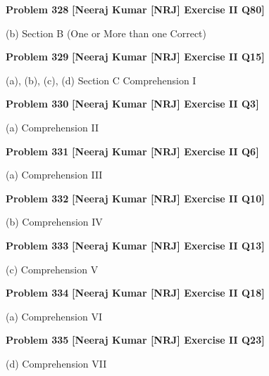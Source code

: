 \begin{problembox}
\textbf{Problem 328} \hfill \textbf{[Neeraj Kumar [NRJ] Exercise II Q80]}
\label{q:ext-nrj_all_questions-328}

(b)
Section B (One or More than one Correct)
\end{problembox}

\begin{problembox}
\textbf{Problem 329} \hfill \textbf{[Neeraj Kumar [NRJ] Exercise II Q15]}
\label{q:ext-nrj_all_questions-329}

(a), (b), (c), (d)
Section C
Comprehension I
\end{problembox}

\begin{problembox}
\textbf{Problem 330} \hfill \textbf{[Neeraj Kumar [NRJ] Exercise II Q3]}
\label{q:ext-nrj_all_questions-330}

(a)
Comprehension II
\end{problembox}

\begin{problembox}
\textbf{Problem 331} \hfill \textbf{[Neeraj Kumar [NRJ] Exercise II Q6]}
\label{q:ext-nrj_all_questions-331}

(a)
Comprehension III
\end{problembox}

\begin{problembox}
\textbf{Problem 332} \hfill \textbf{[Neeraj Kumar [NRJ] Exercise II Q10]}
\label{q:ext-nrj_all_questions-332}

(b)
Comprehension IV
\end{problembox}

\begin{problembox}
\textbf{Problem 333} \hfill \textbf{[Neeraj Kumar [NRJ] Exercise II Q13]}
\label{q:ext-nrj_all_questions-333}

(c)
Comprehension V
\end{problembox}

\begin{problembox}
\textbf{Problem 334} \hfill \textbf{[Neeraj Kumar [NRJ] Exercise II Q18]}
\label{q:ext-nrj_all_questions-334}

(a)
Comprehension VI
\end{problembox}

\begin{problembox}
\textbf{Problem 335} \hfill \textbf{[Neeraj Kumar [NRJ] Exercise II Q23]}
\label{q:ext-nrj_all_questions-335}

(d)
Comprehension VII
\end{problembox}


